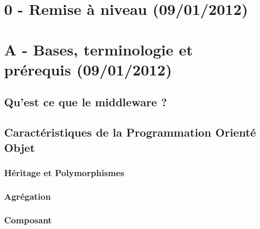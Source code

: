 \section{0 - Remise à niveau (09/01/2012)}

\section{A - Bases, terminologie et prérequis (09/01/2012)}

\subsection{Qu'est ce que le middleware ?}

\subsection{Caractéristiques de la Programmation Orienté Objet}
\subsubsection{Héritage et Polymorphismes}
\subsubsection{Agrégation}
\subsubsection{Composant}

%


